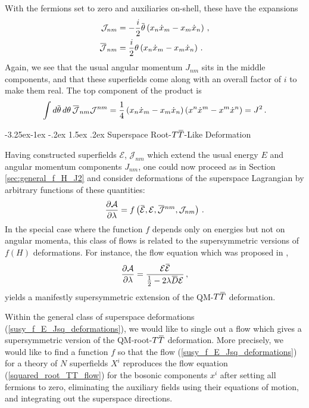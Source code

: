 \documentclass[12pt]{article}
\makeatletter
\numberwithin{equation}{section}
\renewcommand\subsection{\@startsection{subsection}{2}{\z@}%
                                     {-3.25ex\@plus -1ex \@minus -.2ex}%
                                     {1.5ex \@plus .2ex}%
                                     {\normalfont\bfseries}}
\newcommand{\overbar}[1]{\mkern 1.5mu\overline{\mkern-1.5mu#1\mkern-1.5mu}\mkern 1.5mu}
\newcommand{\Dbar}{\overbar{D}}
\newcommand{\thetab}{\overbar{\theta}}
\def\TT{{T\overbar{T}}}
\def\cEb{{\overbar{\mathcal{E}}}}
\def\cE{{\mathcal{E}}}
\makeatother
\begin{document}
%
With the fermions set to zero and auxiliaries on-shell, these have the expansions
%
\begin{align}\label{JJ_int}
    \mathcal{J}_{nm} &= - \frac{i}{2} \thetab \left( x_n \dot{x}_m - x_m \dot{x}_n \right) \, , \nonumber \\
    \overbar{\mathcal{J}}_{nm} &= \frac{i}{2} \theta \left( x_n \dot{x}_m - x_m \dot{x}_n \right) \, .
\end{align}
%
Again, we see that the usual angular momentum $J_{nm}$ sits in the middle components, and that these superfields come along with an overall factor of $i$ to make them real. The top component of the product is
%
\begin{align}
    \int d \thetab \, d \theta \, \overbar{\mathcal{J}}_{nm} \mathcal{J}^{nm} = \frac{1}{4} \left( x_n \dot{x}_m - x_m \dot{x}_n \right) \left( x^n \dot{x}^m - x^m \dot{x}^n \right) = J^2 \, .
\end{align}

\subsection{Superspace Root-$\TT$-Like Deformation}

Having constructed superfields $\mathcal{E}$, $\mathcal{J}_{nm}$ which extend the usual energy $E$ and angular momentum components $J_{nm}$, one could now proceed as in Section \ref{sec:general_f_H_J2} and consider deformations of the superspace Lagrangian by arbitrary functions of these quantities:
%
\begin{align}\label{susy_f_E_Jsq_deformations}
    \frac{\partial \mathcal{A}}{\partial \lambda} = f \left( \cEb , \mathcal{E}, \overbar{\mathcal{J}}^{nm} , \mathcal{J}_{nm}  \right) \, .
\end{align}
%
In the special case where the function $f$ depends only on energies but not on angular momenta, this class of flows is related to the supersymmetric versions of $f(H)$ deformations. For instance, the flow equation which was proposed in \cite{Ebert:2022xfh},
%
\begin{align}
    \frac{\partial \mathcal{A}}{\partial \lambda} = \frac{ \cE \cEb}{\frac{1}{2} - 2 \lambda \Dbar \cE} \, , 
\end{align}
%
yields a manifestly supersymmetric extension of the QM-$\TT$ deformation.

Within the general class of superspace deformations (\ref{susy_f_E_Jsq_deformations}), we would like to single out a flow which gives a supersymmetric version of the QM-root-$\TT$ deformation. More precisely, we would like to find a function $f$ so that the flow (\ref{susy_f_E_Jsq_deformations}) for a theory of $N$ superfields $X^i$ reproduces the flow equation (\ref{squared_root_TT_flow}) for the bosonic components $x^i$ after setting all fermions to zero, eliminating the auxiliary fields using their equations of motion, and integrating out the superspace directions.
\end{document}
